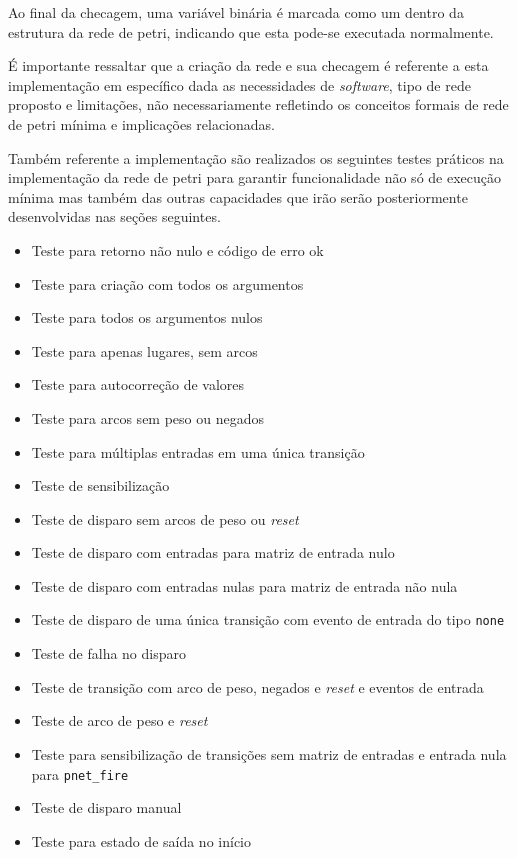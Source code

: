 Ao final da checagem, uma variável binária é marcada como um dentro da estrutura da rede de petri, indicando que esta pode-se executada normalmente.  

É importante ressaltar que a criação da rede e sua checagem é referente a esta implementação em específico dada as necessidades de \textit{software}, tipo de rede proposto e limitações, não necessariamente refletindo os conceitos formais de rede de petri mínima e implicações relacionadas.

Também referente a implementação são realizados os seguintes testes práticos na implementação da rede de petri para garantir funcionalidade não só de execução mínima mas também das outras capacidades que irão serão posteriormente desenvolvidas nas seções seguintes.

\begin{itemize}
	\item Teste para retorno não nulo e código de erro ok
	\item Teste para criação com todos os argumentos
	\item Teste para todos os argumentos nulos
	\item Teste para apenas lugares, sem arcos
	\item Teste para autocorreção de valores
	\item Teste para arcos sem peso ou negados
	\item Teste para múltiplas entradas em uma única transição
	\item Teste de sensibilização
	\item Teste de disparo sem arcos de peso ou \textit{reset}
	\item Teste de disparo com entradas para matriz de entrada nulo
	\item Teste de disparo com entradas nulas para matriz de entrada não nula
	\item Teste de disparo de uma única transição com evento de entrada do tipo \lstinline{none}
	\item Teste de falha no disparo
	\item Teste de transição com arco de peso, negados e \textit{reset} e eventos de entrada
	\item Teste de arco de peso e \textit{reset}
	\item Teste para sensibilização de transições sem matriz de entradas e entrada nula para \lstinline{pnet_fire}
	\item Teste de disparo manual
	\item Teste para estado de saída no início

\end{itemize}
